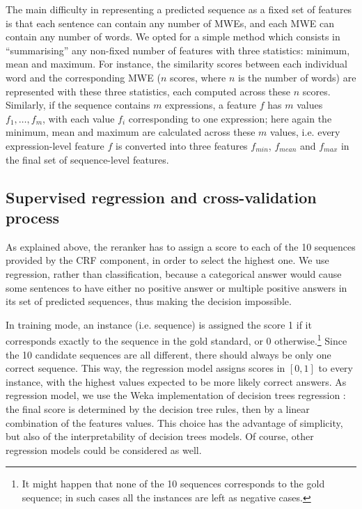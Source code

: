 \documentclass[output=paper
,modfonts
,nonflat]{langsci/langscibook}
\begin{document}
The main difficulty in representing a predicted sequence as a fixed
set of features is that each sentence can contain any number of MWEs,
and each MWE can contain any number of words. We opted for a simple
method which consists in ``summarising'' any non-fixed number of
features with three statistics: minimum, mean and maximum. For
instance, the similarity scores between each individual word and the
corresponding MWE ($n$ scores, where $n$ is the number of words) are represented
with these three statistics, each computed across these $n$
scores. Similarly, if the sequence contains $m$ expressions, a feature
$f$ has $m$ values $f_1,\dots,f_m$, with each value $f_i$ corresponding to one
expression; here again the minimum, mean and maximum are calculated
across these $m$ values, i.e. every expression-level feature $f$ is
converted into three features $f_{min}$, $f_{mean}$ and $f_{max}$ in
the final set of sequence-level features. 




\subsection{Supervised regression and cross-validation process}

As explained above, the reranker has to assign a score to each of the
10 sequences provided by the CRF component, in order to select the highest
one. We use regression, rather than classification, because a
categorical answer would cause some sentences to have either no
positive answer or multiple positive answers in its set of predicted
sequences, thus making the decision impossible.

In training mode, an instance (i.e. sequence) is assigned the score 1 if
it corresponds exactly to the sequence in the gold standard, or 0
otherwise.\footnote{It might happen that none of the 10 sequences
  corresponds to the gold sequence; in such cases all the instances
  are left as negative cases.} Since the 10 candidate sequences are
all different, there should always be only one correct sequence. This
way, the regression model assigns scores in $[0,1]$ to every instance,
with the highest values expected to be more likely correct answers.  As
regression model, we use the Weka \citep{hall2009weka} implementation of
decision trees regression \citep{M5P}: the final score is determined
by the decision tree rules, then by a linear combination of the
features values. This choice has the advantage of simplicity, but also
of the interpretability of decision trees models. Of course, other
regression models could be considered as well.
\end{document}
